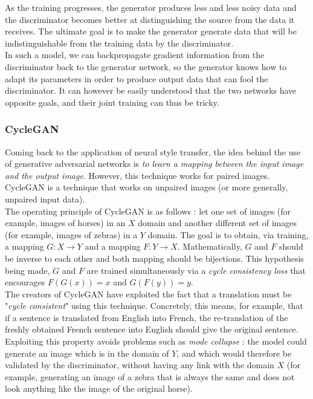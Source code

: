 \documentclass[twocolumn,superscriptaddress,aps,floatfix, nofootinbib]{revtex4-1}
\begin{document}
    As the training progresses, the generator produces less and less noisy data and the discriminator becomes better at distinguishing the source from the data it receives. The ultimate goal is to make the generator generate data that will be indistinguishable from the training data by the discriminator.\\
    
    In such a model, we can backpropagate gradient information from the discriminator back to the generator network, so the generator knows how to adapt its parameters in order to produce output data that can fool the discriminator. It can however be easily understood that the two networks have opposite goals, and their joint training can thus be tricky.
    
    \subsubsection{CycleGAN}
    
    Coming back to the application of neural style transfer, the idea behind the use of generative adversarial networks is \emph{to learn a mapping between the input image and the output image}. However, this technique works for paired images. CycleGAN is a technique that works on unpaired images (or more generally, unpaired input data).\\
    
    The operating principle of CycleGAN is as follows : let one set of images (for example, images of horses) in an $X$ domain and another different set of images (for example, images of zebras) in a $Y$ domain. The goal is to obtain, via training, a mapping $G : X \rightarrow Y$ and a mapping $F : Y \rightarrow X$. Mathematically, $G$ and $F$ should be inverse to each other and both mapping should be bijections. This hypothesis being made, $G$ and $F$ are trained simultaneously via a \emph{cycle consistency loss} that encourages $F(G(x)) = x$ and $G(F(y)) = y$.\\
    
    The creators of CycleGAN have exploited the fact that a translation must be "\emph{cycle consistent}" using this technique. Concretely, this means, for example, that if a sentence is translated from English into French, the re-translation of the freshly obtained French sentence into English should give the original sentence.\\
    
    Exploiting this property avoids problems such as \emph{mode collapse} : the model could generate an image which is in the domain of $Y$, and which would therefore be validated by the discriminator, without having any link with the domain $X$ (for example, generating an image of a zebra that is always the same and does not look anything like the image of the original horse).\\
    
\end{document}
